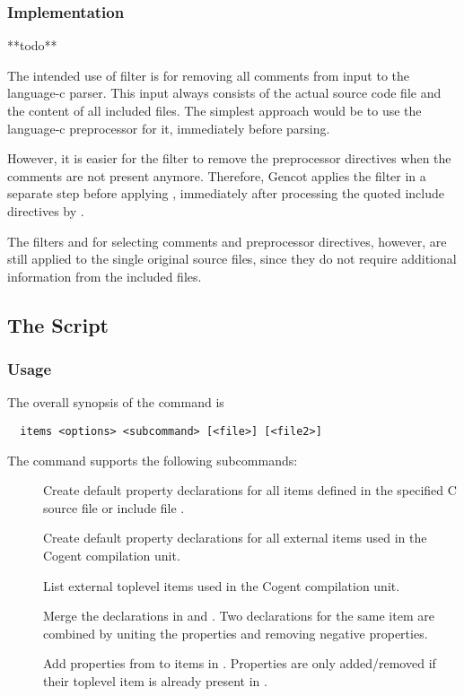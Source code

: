 \subsubsection{Implementation}

**todo**

The intended use of filter  is for removing all comments from input to the language-c parser.
This input always consists of the actual source code file and the content of all included files. The simplest approach
would be to use the language-c preprocessor for it, immediately before parsing. 

However, it is easier for the filter  to remove the preprocessor directives when the comments are 
not present anymore. Therefore, Gencot applies the filter  in a separate step before applying
, immediately after processing the quoted include directives by .
 
The filters  and  for selecting comments and preprocessor directives, however, are
still applied to the single original source files, since they do not require additional information from the included files.


\subsection{The  Script}
\label{impl-all-items}

\subsubsection{Usage}

The overall synopsis of the  command is
\begin{verbatim}
  items <options> <subcommand> [<file>] [<file2>]
\end{verbatim}

The  command supports the following subcommands:
\begin{description}
\item[] Create default property declarations for all items defined in the specified C source file
or include file . 

\item[] Create default property declarations for all external items used in the Cogent compilation 
unit. 

\item[] List external toplevel items used in the Cogent compilation unit. 

\item[] Merge the declarations in  and . Two declarations for the 
same item are combined by uniting the properties and removing negative properties.

\item[] Add properties from  to items in . Properties are only added/removed
if their toplevel item is already present in .

\end{description}

